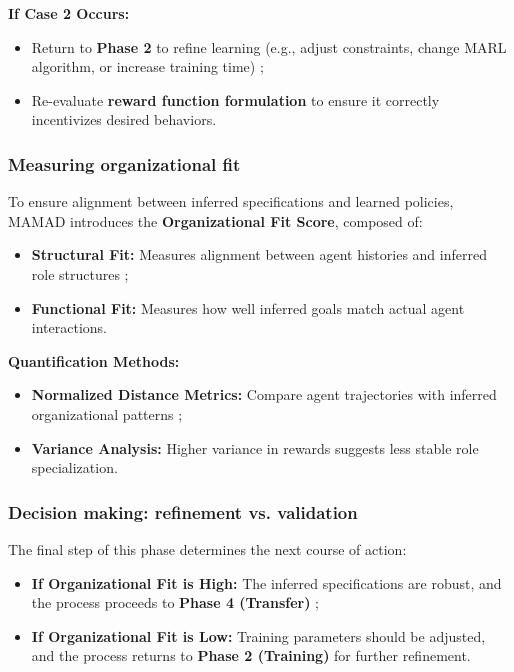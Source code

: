 \documentclass[pdflatex,sn-mathphys-num]{sn-jnl}%
\theoremstyle{thmstyleone}%
\theoremstyle{thmstyletwo}%
\theoremstyle{thmstylethree}%
\begin{document}
\noindent \textbf{If Case 2 Occurs:}
\begin{itemize}
    \item Return to \textbf{Phase 2} to refine learning (e.g., adjust constraints, change MARL algorithm, or increase training time) ;
    \item Re-evaluate \textbf{reward function formulation} to ensure it correctly incentivizes desired behaviors.
\end{itemize}

\subsubsection{Measuring organizational fit}
To ensure alignment between inferred specifications and learned policies, MAMAD introduces the \textbf{Organizational Fit Score}, composed of:

\begin{itemize}
    \item \textbf{Structural Fit:} Measures alignment between agent histories and inferred role structures ;
    \item \textbf{Functional Fit:} Measures how well inferred goals match actual agent interactions.
\end{itemize}

\noindent \textbf{Quantification Methods:}
\begin{itemize}
    \item \textbf{Normalized Distance Metrics:} Compare agent trajectories with inferred organizational patterns ;
    \item \textbf{Variance Analysis:} Higher variance in rewards suggests less stable role specialization.
\end{itemize}

\subsubsection{Decision making: refinement vs. validation}
The final step of this phase determines the next course of action:

\begin{itemize}
    \item \textbf{If Organizational Fit is High:} The inferred specifications are robust, and the process proceeds to \textbf{Phase 4 (Transfer)} ;
    \item \textbf{If Organizational Fit is Low:} Training parameters should be adjusted, and the process returns to \textbf{Phase 2 (Training)} for further refinement.
\end{itemize}
\end{document}
